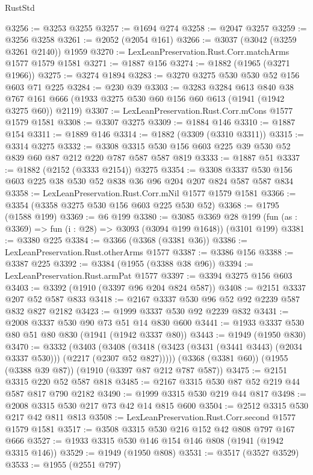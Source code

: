 \begin{lexlean}{RustStd}
\begin{coremodule}
@3256 := @3253 @3255
@3257 := @1694 @274
@3258 := @2047 @3257
@3259 := @3256 @3258
@3261 := @2052 (@2054 @161)
@3266 := @3037 (@3042 (@3259 @3261 @2140)) @1959
@3270 := LexLeanPreservation.Rust.Corr.matchArms @1577 @1579 @1581
@3271 := @1887 @156
@3274 := @1882 (@1965 (@3271 @1966))
@3275 := @3274 @1894
@3283 := @3270 @3275 @530 @530 @52 @156 @603 @71 @225
@3284 := @230 @39
@3303 := @3283
    @3284
    @613
    @840
    @38
    @767
    @161
    @666
    (@1933 @3275 @530 @60 @156 @60 @613 (@1941 (@1942 @3275 @60)) @2119)
@3307 := LexLeanPreservation.Rust.Corr.mCons @1577 @1579 @1581
@3308 := @3307 @3275
@3309 := @1884 @146
@3310 := @1887 @154
@3311 := @1889 @146
@3314 := @1882 (@3309 (@3310 @3311))
@3315 := @3314 @3275
@3332 := @3308 @3315 @530 @156 @603 @225 @39 @530 @52 @839 @60 @87 @212 @220 @787 @587 @587 @819
@3333 := @1887 @51
@3337 := @1882 (@2152 (@3333 @2154)) @3275
@3354 := @3308 @3337 @530 @156 @603 @225 @38 @530 @52 @838 @36 @96 @204 @207 @824 @587 @587 @834
@3358 := LexLeanPreservation.Rust.Corr.mNil @1577 @1579 @1581
@3366 := @3354 (@3358 @3275 @530 @156 @603 @225 @530 @52)
@3368 := @1795 (@1588 @199)
@3369 := @6 @199
@3380 := @3085
    @3369
    @28
    @199
    (fun (as : @3369) => fun (i : @28) => @3093 (@3094 @199 @1648))
    (@3101 @199)
@3381 := @3380 @225
@3384 := @3366 (@3368 (@3381 @36))
@3386 := LexLeanPreservation.Rust.otherArms @1577
@3387 := @3386 @156
@3388 := @3387 @225
@3392 := @3384 (@1955 (@3388 @38 @96))
@3394 := LexLeanPreservation.Rust.armPat @1577
@3397 := @3394 @3275 @156 @603
@3403 := @3392 (@1910 (@3397 @96 @204 @824 @587))
@3408 := @2151 @3337 @207 @52 @587 @833
@3418 := @2167 @3337 @530 @96 @52 @92 @2239 @587 @832 @827 @2182
@3423 := @1999 @3337 @530 @92 @2239 @832
@3431 := @2008 @3337 @530 @90 @73 @51 @14 @830 @600
@3441 := @1933 @3337 @530 @80 @51 @80 @830 (@1941 (@1942 @3337 @80))
@3443 := @1949 (@1950 @830)
@3470 := @3332
    (@3403
      (@3408 (@3418 (@3423 (@3431 (@3441 @3443) (@2034 @3337 @530))) (@2217 (@2307 @52 @827)))))
    (@3368 (@3381 @60))
    (@1955 (@3388 @39 @87))
    (@1910 (@3397 @87 @212 @787 @587))
@3475 := @2151 @3315 @220 @52 @587 @818
@3485 := @2167 @3315 @530 @87 @52 @219 @44 @587 @817 @790 @2182
@3490 := @1999 @3315 @530 @219 @44 @817
@3498 := @2008 @3315 @530 @217 @73 @42 @14 @815 @600
@3504 := @2512 @3315 @530 @217 @42 @811 @813
@3508 := LexLeanPreservation.Rust.Corr.second @1577 @1579 @1581
@3517 := @3508 @3315 @530 @216 @152 @42 @808 @797 @167 @666
@3527 := @1933 @3315 @530 @146 @154 @146 @808 (@1941 (@1942 @3315 @146))
@3529 := @1949 (@1950 @808)
@3531 := @3517 (@3527 @3529)
@3533 := @1955 (@2551 @797)

\end{coremodule}
\end{lexlean}
